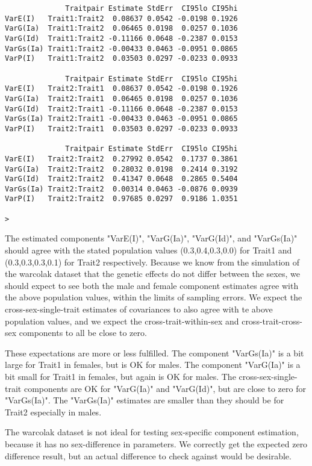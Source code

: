 \documentclass[titlepage]{article}  %
\begin{document}
\begin{verbatim}
              Traitpair Estimate StdErr  CI95lo CI95hi
VarE(I)   Trait1:Trait2  0.08637 0.0542 -0.0198 0.1926
VarG(Ia)  Trait1:Trait2  0.06465 0.0198  0.0257 0.1036
VarG(Id)  Trait1:Trait2 -0.11166 0.0648 -0.2387 0.0153
VarGs(Ia) Trait1:Trait2 -0.00433 0.0463 -0.0951 0.0865
VarP(I)   Trait1:Trait2  0.03503 0.0297 -0.0233 0.0933

              Traitpair Estimate StdErr  CI95lo CI95hi
VarE(I)   Trait2:Trait1  0.08637 0.0542 -0.0198 0.1926
VarG(Ia)  Trait2:Trait1  0.06465 0.0198  0.0257 0.1036
VarG(Id)  Trait2:Trait1 -0.11166 0.0648 -0.2387 0.0153
VarGs(Ia) Trait2:Trait1 -0.00433 0.0463 -0.0951 0.0865
VarP(I)   Trait2:Trait1  0.03503 0.0297 -0.0233 0.0933

              Traitpair Estimate StdErr  CI95lo CI95hi
VarE(I)   Trait2:Trait2  0.27992 0.0542  0.1737 0.3861
VarG(Ia)  Trait2:Trait2  0.28032 0.0198  0.2414 0.3192
VarG(Id)  Trait2:Trait2  0.41347 0.0648  0.2865 0.5404
VarGs(Ia) Trait2:Trait2  0.00314 0.0463 -0.0876 0.0939
VarP(I)   Trait2:Trait2  0.97685 0.0297  0.9186 1.0351

> 
\end{verbatim}
The estimated components "VarE(I)", "VarG(Ia)", "VarG(Id)", and "VarGs(Ia)" should agree with the stated population values (0.3,0.4,0.3,0.0) for Trait1 and (0.3,0.3,0.3,0.1) for Trait2 respectively.  Because we know from the simulation of the warcolak dataset that the genetic effects do not differ between the sexes, we should expect to see both the male and female component estimates agree with the above population values, within the limits of sampling errors. We expect the cross-sex-single-trait estimates of covariances to also agree with te above population values, and we expect the cross-trait-within-sex and cross-trait-cross-sex components to all be close to zero.

These expectations are  more or less fulfilled. The component "VarGs(Ia)" is a bit large for Trait1 in females, but is OK for males. The component "VarG(Ia)" is a bit small for Trait1 in females, but again is OK for males. The cross-sex-single-trait components are OK for "VarG(Ia)" and "VarG(Id)", but are close to zero for "VarGs(Ia)". The "VarGs(Ia)" estimates are smaller than they should be for Trait2 especially in males.

The warcolak dataset is not ideal for testing sex-specific component estimation, because it has no sex-difference in parameters. We correctly get the expected zero difference result, but an actual difference to check against would be desirable.
\end{document}
